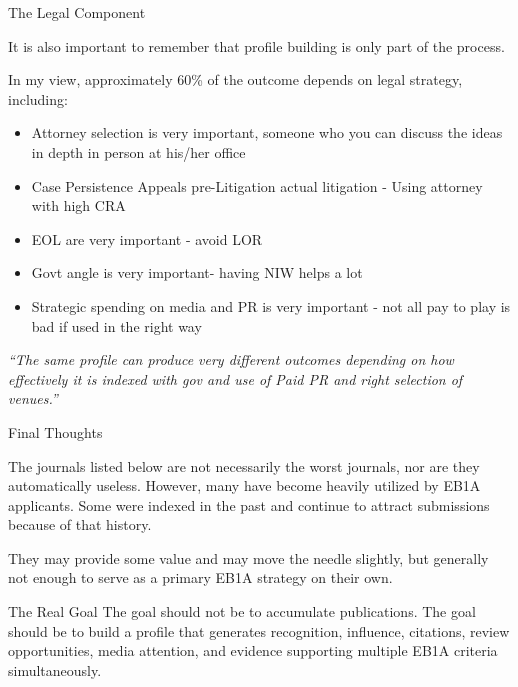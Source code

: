 \documentclass{beamer}
\begin{document}
	\begin{frame}{The Legal Component}
		\begin{block}{}
			It is also important to remember that profile building is only part of the process.
		\end{block}
		\vspace{0.3cm}
		In my view, approximately 60\% of the outcome depends on legal strategy, including:
		\begin{itemize}i
			\item Attorney selection is very important, someone who you can discuss the ideas in depth in person at his/her office
			\item Case Persistence Appeals pre-Litigation actual litigation - Using attorney with high CRA
			\item EOL are very important - avoid LOR
			\item Govt angle is very important- having NIW helps a lot
			\item Strategic spending on media and PR is very important - not all pay to play is bad if used in the right way
		\end{itemize}
		\vspace{0.3cm}
		\centering
		\textit{“The same profile can produce very different outcomes depending on how effectively it is indexed with gov and use of Paid PR and right selection of venues.”}
	\end{frame}
	
	\begin{frame}{Final Thoughts}
		\begin{block}{}
			The journals listed below are not necessarily the worst journals, nor are they automatically useless. However, many have become heavily utilized by EB1A applicants. Some were indexed in the past and continue to attract submissions because of that history.
		\end{block}
		\vspace{0.3cm}
		They may provide some value and may move the needle slightly, but generally not enough to serve as a primary EB1A strategy on their own.
		\vspace{0.3cm}
		\begin{exampleblock}{The Real Goal}
			The goal should not be to accumulate publications. The goal should be to build a profile that generates recognition, influence, citations, review opportunities, media attention, and evidence supporting multiple EB1A criteria simultaneously.
		\end{exampleblock}
	\end{frame}
	
\end{document}
